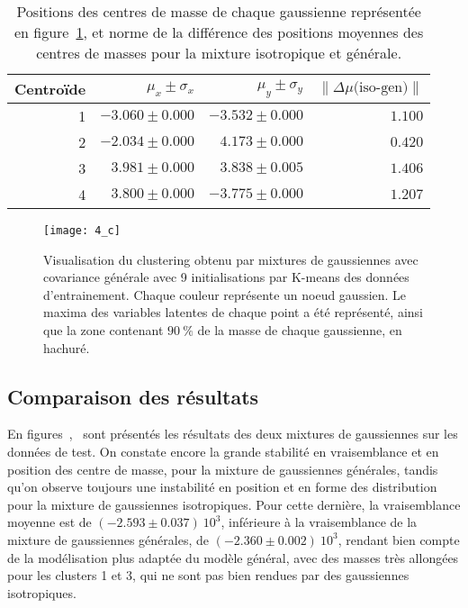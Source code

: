 \documentclass[12pt,a4paper,onecolumn]{article}
\begin{document}
\begin{table}[b]
	\centering
	\begin{tabular}{r|r|r|r}
		\hline
		Centroïde & \(\mu_x \pm \sigma_x\) & \(\mu_y \pm \sigma_y\) & \(\lVert\Delta\mu\text{(iso-gen)}\rVert\) \\\hline
		1         & \(-3.060\pm 0.000\)    & \(-3.532\pm 0.000\)    & \(1.100\)                                 \\\hline
		2         & \( -2.034 \pm 0.000\)  & \( 4.173\pm 0.000 \)   & \(0.420\)                                 \\\hline
		3         & \( 3.981\pm 0.000\)    & \( 3.838\pm 0.005\)    & \(1.406\)                                 \\\hline
		4         & \( 3.800\pm 0.000\)    & \( -3.775\pm 0.000 \)  & \(1.207\)                                 \\\hline
	\end{tabular}
	\caption{Positions des centres de masse de chaque gaussienne représentée en figure~\ref{fig_4_c}, et norme de la différence des positions moyennes des centres de masses pour la mixture isotropique et générale.}
	\label{tab_4_c}
\end{table}


\begin{figure}[H]
	\centering
	\texttt{[image: 4\_c]}
	\caption{Visualisation du clustering obtenu par mixtures de gaussiennes avec covariance générale avec 9 initialisations par K-means des données d'entrainement. Chaque couleur représente un noeud gaussien. Le maxima des variables latentes de chaque point a été représenté, ainsi que la zone contenant \(90~\%\) de la masse de chaque gaussienne, en hachuré.}
	\label{fig_4_c}
\end{figure}

\subsection{Comparaison des résultats}

En figures~,~ sont présentés les résultats des deux mixtures de gaussiennes sur les données de test. On constate encore la grande stabilité en vraisemblance et en position des centre de masse, pour la mixture de gaussiennes générales, tandis qu'on observe toujours une instabilité en position et en forme des distribution pour la mixture de gaussiennes isotropiques. Pour cette dernière, la vraisemblance moyenne est de \((-2.593\pm0.037)~10^3\), inférieure à la vraisemblance de la mixture de gaussiennes générales, de \((-2.360\pm0.002)~10^3\), rendant bien compte de la modélisation plus adaptée du modèle général, avec des masses très allongées pour les clusters 1 et 3, qui ne sont pas bien rendues par des gaussiennes isotropiques.
\end{document}
